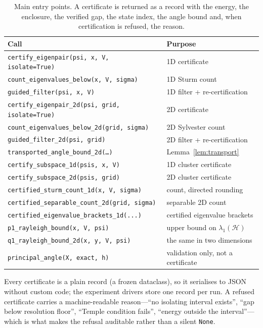 \begin{table}[t]
\centering
\footnotesize
\setlength{\tabcolsep}{2pt}
\begin{tabular}{@{}ll@{}}
\toprule
Call & Purpose \\
\midrule
\texttt{certify\_eigenpair(psi, x, V, isolate=True)} & 1D certificate \\
\texttt{count\_eigenvalues\_below(x, V, sigma)} & 1D Sturm count \\
\texttt{guided\_filter(psi, x, V)} & 1D filter + re-certification \\
\texttt{certify\_eigenpair\_2d(psi, grid, isolate=True)} & 2D certificate \\
\texttt{count\_eigenvalues\_below\_2d(grid, sigma)} & 2D Sylvester count \\
\texttt{guided\_filter\_2d(psi, grid)} & 2D filter + re-certification \\
\texttt{transported\_angle\_bound\_2d(\dots)} & Lemma~\ref{lem:transport} \\
\texttt{certify\_subspace\_1d(psis, x, V)} & 1D cluster certificate \\
\texttt{certify\_subspace\_2d(psis, grid)} & 2D cluster certificate \\
\texttt{certified\_sturm\_count\_1d(x, V, sigma)} & count, directed rounding \\
\texttt{certified\_separable\_count\_2d(grid, sigma)} & separable 2D count \\
\texttt{certified\_eigenvalue\_brackets\_1d(...)} & certified eigenvalue brackets \\
\texttt{p1\_rayleigh\_bound(x, V, psi)} & upper bound on $\lambda_1(\mathcal H)$ \\
\texttt{q1\_rayleigh\_bound\_2d(x, y, V, psi)} & the same in two dimensions \\
\texttt{principal\_angle(X, exact, h)} & validation only, not a certificate \\
\bottomrule
\end{tabular}
\caption{Main entry points. A certificate is returned as a record with the
energy, the enclosure, the verified gap, the state index, the angle bound and,
when certification is refused, the reason.}
\label{tab:api}
\end{table}

Every certificate is a plain record (a frozen dataclass), so it serialises to
JSON without custom code; the experiment drivers store one record per run. A
refused certificate carries a machine-readable reason---``no isolating
interval exists'', ``gap below resolution floor'', ``Temple condition fails'',
``energy outside the interval''---which is what makes the refusal auditable
rather than a silent \texttt{None}.

